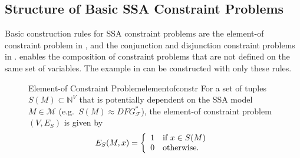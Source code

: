 \subsection{Structure of Basic SSA Constraint Problems}

    Basic construction rules for SSA constraint problems are the element-of
    constraint problem in ,
    and the conjunction and disjunction constraint problems in
    .
     enables the composition of constraint problems that are
    not defined on the same set of variables.
    The example in  can be constructed with only
    these rules.

\begin{figure}[p]
    \begin{definition}{Element-of Constraint Problem}{elementofconstr}
        For a set of tuples $S(M)\subset\mathbb N^V$ that is potentially
        dependent on the SSA model $M\in\mathcal M$
        (e.g.\ $S(M)\approx DFG_\mathcal F^*$),
        the element-of constraint problem $(V,E_S)$ is given by
        \begin{align*}
            E_S(M,x)=\left\{\begin{array}{l}
                                1\text{\quad if }x \in S(M)\\
                                0\text{\quad otherwise}.
                            \end{array}\right.
        \end{align*}
    \end{definition}


\end{figure}
